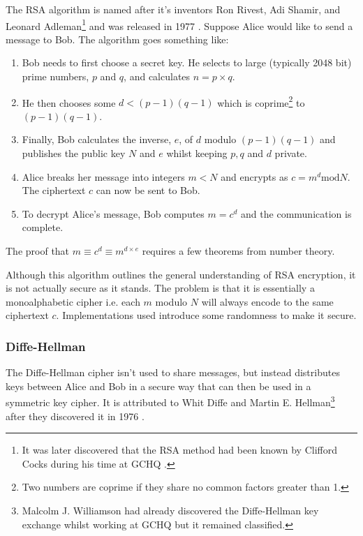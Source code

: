 The RSA algorithm is named after it's inventors Ron Rivest, Adi Shamir, and Leonard Adleman\footnote{It was later discovered that the RSA method had been known by Clifford Cocks during his time at GCHQ \cite{}.} and was released in 1977 \cite{}. Suppose Alice would like to send a message to Bob. The algorithm goes something like:

\begin{enumerate}
	\item Bob needs to first choose a secret key. He selects to large (typically 2048 bit) prime numbers, $p$ and $q$, and calculates $n = p \times q$.
	\item He then chooses some $d < (p-1)(q-1)$ which is coprime\footnote{Two numbers are coprime if they share no common factors greater than 1.} to $(p-1)(q-1)$.
	\item Finally, Bob calculates the inverse, $e$, of $d$ modulo $(p-1)(q-1)$ and publishes the public key $N$ and $e$ whilst keeping $p,q$ and $d$ private.
	\item Alice breaks her message into integers $m < N$ and encrypts as $c = m^d \mathrm{ mod } N$. The ciphertext $c$ can now be sent to Bob.
	\item To decrypt Alice's message, Bob computes $m = c^d$ and the communication is complete. 
\end{enumerate}   

The proof that $m \equiv c^d \equiv m^{d\times e}$ requires a few theorems from number theory. 

Although this algorithm outlines the general understanding of RSA encryption, it is not actually secure as it stands. The problem is that it is essentially a monoalphabetic cipher i.e. each $m$ modulo $N$ will always encode to the same ciphertext $c$. Implementations used introduce some randomness to make it secure.


\subsubsection*{Diffe-Hellman}

The Diffe-Hellman cipher isn't used to share messages, but instead distributes keys between Alice and Bob in a secure way that can then be used in a symmetric key cipher. It is attributed to Whit Diffe and Martin E. Hellman\footnote{Malcolm J. Williamson had already discovered the Diffe-Hellman key exchange whilst working at GCHQ but it remained classified.} after they discovered it in 1976 \cite{}.


